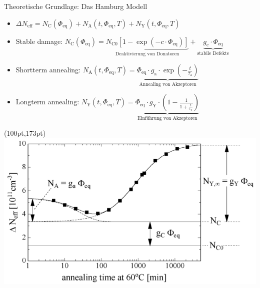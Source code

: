 \documentclass[aspectratio=43, 10pt]{beamer}
\begin{document}
\begin{frame}{Theoretische Grundlage: Das Hamburg Modell}
  \vspace{-1.8cm}
  \begin{itemize}
    \item   $\Delta N_{\mathrm{eff}} = N_{\mathrm{C}}(\Phi_{\mathrm{eq}}) + N_{\mathrm{A}}(t, \Phi_{\mathrm{eq}}, T) + N_{\mathrm{Y}}(t, \Phi_{\mathrm{eq}}, T)$
    \medskip
    \item Stable damage:\: $N_{\mathrm{C}}(\Phi_{\mathrm{eq}}) = \underbrace{ N_{\mathrm{C0}}[1-\exp{(-c \cdot \Phi_{\mathrm{eq}})}] }_{\text{Deaktivierung von Donatoren}} + \underbrace{ g_{\mathrm{c}} \cdot \Phi_{\mathrm{eq}} }_{\text{stabile Defekte}}$

    \item Shortterm annealing:\: $N_{\mathrm{A}}(t, \Phi_{\mathrm{eq}}, T)= \underbrace{ \Phi_{\mathrm{eq}} \cdot g_{\mathrm{a}} \cdot \exp{(-\frac{t}{\tau_{\mathrm{a}}})} }_{\text{Annealing von Akzeptoren}}$

    \item Longterm annealing:\: $N_{\mathrm{Y}}(t, \Phi_{\mathrm{eq}}, T)= \underbrace{\Phi_{\mathrm{eq}} \cdot g_{\mathrm{Y}} \cdot \left(1-\frac{1}{1+\frac{t}{\tau_{\mathrm{Y}}}}\right)}_{\text{Einführung von Akzeptoren}}$
  \end{itemize}
  \begin{textblock*}{8pt}(100pt,173pt)
  \includegraphics[height=7.5\baselineskip]{images/n_eff_4_3.png}
  \end{textblock*}

\end{frame}
\end{document}
